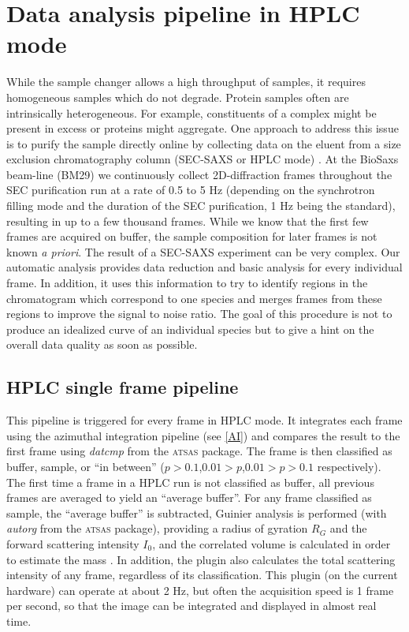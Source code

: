 \documentclass[preprint,pdf]{iucr}              %
\begin{document}
\section{Data analysis pipeline in HPLC mode}
While the sample changer allows a high throughput of samples, it requires
homogeneous samples which do not degrade. 
Protein samples often are intrinsically heterogeneous. 
For example, constituents of a complex might be present in excess or proteins
might aggregate.  
One approach to address this issue is to purify the sample directly online by collecting data
on the eluent from a size exclusion chromatography column (SEC-SAXS or HPLC mode) \cite{SECPaper2012,SECP12,SECSWING}.
At the BioSaxs beam-line (BM29) we continuously collect 2D-diffraction frames
throughout the SEC purification run at a rate of 0.5 to 5 Hz 
(depending on the synchrotron filling mode and the duration of the SEC purification, 1 Hz being the standard), 
resulting in up to a few thousand frames. 
While we know that the first few frames are acquired on buffer, the sample composition 
for later frames is not known \textit{a priori}. 
The result of a SEC-SAXS experiment can be very complex. 
Our automatic analysis provides data reduction and basic analysis for every
individual frame. 
In addition, it uses this information to try to identify regions in the
chromatogram which correspond to one species and merges frames from these
regions to improve the signal to noise ratio.
The goal of this procedure is not to produce an idealized curve of an individual
species but to give a hint on the overall data quality as soon as possible.

\subsection{HPLC single frame pipeline}

This pipeline is triggered for every frame in HPLC mode. 
It integrates each frame using the azimuthal integration pipeline (see
\ref{AI}) and compares the result to the first frame using \textit{datcmp} from the
\textsc{atsas} package. 
The frame is then classified as buffer, sample, or ``in between'' 
($p>0.1$,$0.01 > p$,$0.01>p>0.1$  respectively). 
The first time a frame in a HPLC run is not classified as buffer, all previous
frames are averaged to yield an ``average buffer''. 
For any frame classified as sample, the ``average buffer'' is subtracted, Guinier
analysis is performed (with \textit{autorg} from the \textsc{atsas} package), 
providing a radius of gyration $R_G$ and the forward scattering intensity $I_0$,
and the correlated volume is calculated in order to estimate the mass
\cite{RamboTainerNature2013}. 
In addition, the plugin also calculates the total scattering intensity of any
frame, regardless of its classification.
This plugin (on the current hardware) can operate at about 2 Hz, but often the
acquisition speed is 1 frame per second, so that the image can be integrated and
displayed in almost real time.
\end{document}
